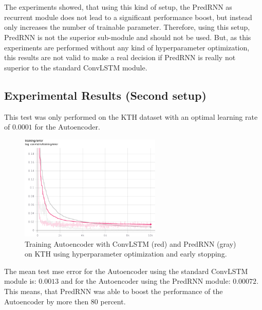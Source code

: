  \\\\
 The experiments showed, that using this kind of setup, the PredRNN as recurrent module does not lead to a significant performance boost, but instead only
 increases the number of trainable parameter. Therefore, using this setup, PredRNN is not the superior sub-module and should not be used. But, as this experiments
 are performed without any kind of hyperparameter optimization, this results are not valid to make a real decision if PredRNN is really not superior to the 
 standard ConvLSTM module.

 \subsection{Experimental Results (Second setup)} \label{subsection::second_exp}
  This test was only performed on the KTH dataset with an optimal learning rate of $0.0001$ for the Autoencoder.
  \begin{figure}[H]
   \includegraphics[width=0.6\textwidth]{../Images/exp2_training_error.png}
   \centering
   \caption{Training Autoencoder with ConvLSTM (red) and PredRNN (gray) on KTH using hyperparameter optimization and early stopping.}
   \label{fig:autoenc_exp2_training}
  \end{figure}\noindent
  The mean test mse error for the Autoencoder using the standard ConvLSTM module is: $0.0013$ and for the Autoencoder using the PredRNN module: $0.00072$.
  This means, that PredRNN was able to boost the performance of the Autoencoder by more then $80$ percent.
